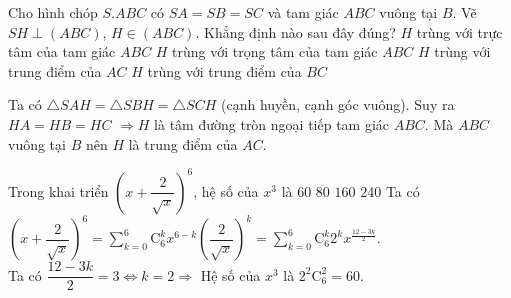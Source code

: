 \begin{ex}%
Cho hình chóp $S.ABC$ có $SA=SB=SC$ và tam giác $ABC$ vuông tại $B$. Vẽ $SH\perp (ABC)$, $H\in (ABC)$. Khẳng định nào sau đây đúng?
\choice
{$H$ trùng với trực tâm của tam giác $ABC$}
{$H$ trùng với trọng tâm của tam giác $ABC$}
{\True $H$ trùng với trung điểm của $AC$}
{$H$ trùng với trung điểm của $BC$}
\loigiai
{
\immini
{Ta có $\triangle SAH=\triangle SBH=\triangle SCH$ (cạnh huyền, cạnh góc vuông). Suy ra $HA=HB=HC$ $\Rightarrow H$ là tâm đường tròn ngoại tiếp tam giác $ABC$. Mà $ABC$ vuông tại $B$ nên $H$ là trung điểm của $AC$.
}
{
}	
}
\end{ex}


\begin{ex}%
Trong khai triển $\left(x+\dfrac{2}{\sqrt{x}}\right)^6$, hệ số của $x^3$ là
\choice
{\True $60$}
{$80$}
{$160$}
{$240$}
\loigiai
{
Ta có $\left(x+\dfrac{2}{\sqrt{x}}\right)^6=\displaystyle\sum\limits_{k=0}^{6}\mathrm{C}^k_{6}x^{6-k}\left(\dfrac{2}{\sqrt{x}}\right)^k
=\displaystyle\sum\limits_{k=0}^{6}\mathrm{C}^k_{6}2^kx^{\tfrac{12-3k}{2}}$.\\
Ta có $\dfrac{12-3k}{2}=3\Leftrightarrow k=2\Rightarrow$ Hệ số của $x^3$ là $2^2\mathrm{C}^2_6=60$.
}
\end{ex}


